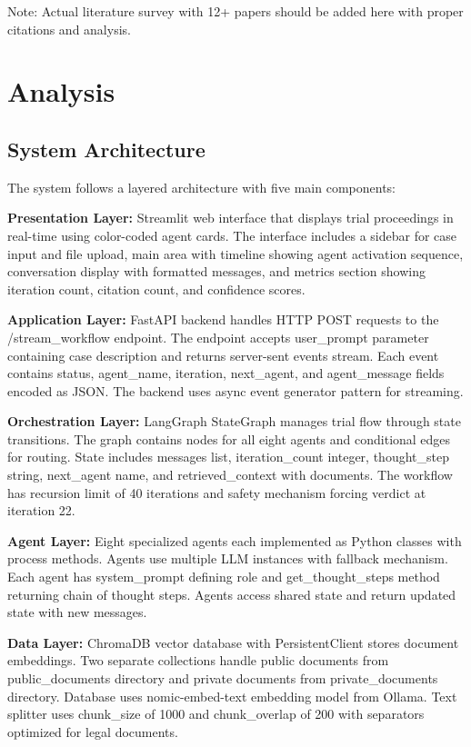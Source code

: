\documentclass[12pt,singleside,a4paper]{article}
\begin{document}
Note: Actual literature survey with 12+ papers should be added here with proper citations and analysis.

\pagebreak
\section{Analysis}

\subsection{System Architecture}
The system follows a layered architecture with five main components:

\textbf{Presentation Layer:} Streamlit web interface that displays trial proceedings in real-time using color-coded agent cards. The interface includes a sidebar for case input and file upload, main area with timeline showing agent activation sequence, conversation display with formatted messages, and metrics section showing iteration count, citation count, and confidence scores.

\textbf{Application Layer:} FastAPI backend handles HTTP POST requests to the /stream\_workflow endpoint. The endpoint accepts user\_prompt parameter containing case description and returns server-sent events stream. Each event contains status, agent\_name, iteration, next\_agent, and agent\_message fields encoded as JSON. The backend uses async event generator pattern for streaming.

\textbf{Orchestration Layer:} LangGraph StateGraph manages trial flow through state transitions. The graph contains nodes for all eight agents and conditional edges for routing. State includes messages list, iteration\_count integer, thought\_step string, next\_agent name, and retrieved\_context with documents. The workflow has recursion limit of 40 iterations and safety mechanism forcing verdict at iteration 22.

\textbf{Agent Layer:} Eight specialized agents each implemented as Python classes with process methods. Agents use multiple LLM instances with fallback mechanism. Each agent has system\_prompt defining role and get\_thought\_steps method returning chain of thought steps. Agents access shared state and return updated state with new messages.

\textbf{Data Layer:} ChromaDB vector database with PersistentClient stores document embeddings. Two separate collections handle public documents from public\_documents directory and private documents from private\_documents directory. Database uses nomic-embed-text embedding model from Ollama. Text splitter uses chunk\_size of 1000 and chunk\_overlap of 200 with separators optimized for legal documents.
\end{document}
